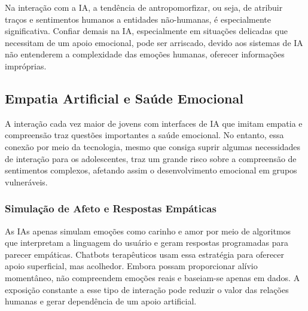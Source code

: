 \documentclass[12pt]{article}
\begin{document}
Na interação com a IA, a tendência de antropomorfizar, ou seja, de atribuir traços e sentimentos humanos a entidades não-humanas, é especialmente significativa. Confiar demais na IA, especialmente em situações delicadas que necessitam de um apoio emocional, pode ser arriscado, devido aos sistemas de IA não entenderem a complexidade das emoções humanas, oferecer informações impróprias. \cite{unit2025}


\subsection{Empatia Artificial e Saúde Emocional}

A interação cada vez maior de jovens com interfaces de IA que imitam empatia e compreensão traz questões importantes a saúde emocional. No entanto, essa conexão por meio da tecnologia, mesmo que consiga suprir algumas necessidades de interação para os adolescentes, traz um grande risco sobre a compreensão de sentimentos complexos, afetando assim o desenvolvimento emocional em grupos vulneráveis. 


\subsubsection{Simulação de Afeto e Respostas Empáticas}

As IAs apenas simulam emoções como carinho e amor por meio de algoritmos que interpretam a linguagem do usuário e geram respostas programadas para parecer empáticas. Chatbots terapêuticos usam essa estratégia para oferecer apoio superficial, mas acolhedor. Embora possam proporcionar alívio momentâneo, não compreendem emoções reais e baseiam-se apenas em dados. A exposição constante a esse tipo de interação pode reduzir o valor das relações humanas e gerar dependência de um apoio artificial.  \cite{fast2025}

\end{document}
